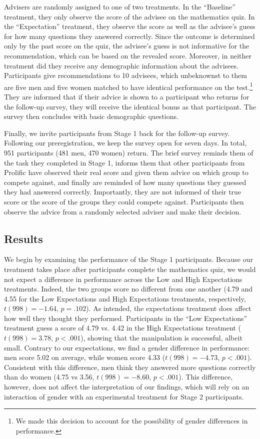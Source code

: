 \documentclass[
  man,
  floatsintext,
  longtable,
  nolmodern,
  notxfonts,
  notimes,
  colorlinks=true,linkcolor=blue,citecolor=blue,urlcolor=blue]{apa7}
\begin{document}
Advisers are randomly assigned to one of two treatments. In the
``Baseline'' treatment, they only observe the score of the advisee on
the mathematics quiz. In the ``Expectation'' treatment, they observe the
score as well as the advisee's guess for how many questions they
answered correctly. Since the outcome is determined only by the past
score on the quiz, the advisee's guess is not informative for the
recommendation, which can be based on the revealed score. Moreover, in
neither treatment did they receive any demographic information about the
advisees. Participants give recommendations to 10 advisees, which
unbeknownst to them are five men and five women matched to have
identical performance on the test.\footnote{We made this decision to
  account for the possibility of gender differences in performance.}
They are informed that if their advice is shown to a participant who
returns for the follow-up survey, they will receive the identical bonus
as that participant. The survey then concludes with basic demographic
questions.

Finally, we invite participants from Stage 1 back for the follow-up
survey. Following our preregistration, we keep the survey open for seven
days. In total, 951 participants (481 men, 470 women) return. The brief
survey reminds them of the task they completed in Stage 1, informs them
that other participants from Prolific have observed their real score and
given them advice on which group to compete against, and finally are
reminded of how many questions they guessed they had answered correctly.
Importantly, they are not informed of their true score or the score of
the groups they could compete against. Participants then observe the
advice from a randomly selected adviser and make their decision.

\subsection{Results}\label{results-2}

We begin by examining the performance of the Stage 1 participants.
Because our treatment takes place after participants complete the
mathematics quiz, we would not expect a difference in performance across
the Low and High Expectations treatments. Indeed, the two groups score
no different from one another (4.79 and 4.55 for the Low Expectations
and High Expectations treatments, respectively, \(t(998) = -1.64\),
\(p = .102\)). As intended, the expectations treatment does affect how
well they thought they performed. Participants in the ``Low
Expectations'' treatment guess a score of 4.79 vs. 4.42 in the High
Expectations treatment (\(t(998) = 3.78\), \(p < .001\)), showing that
the manipulation is successful, albeit small. Contrary to our
expectations, we find a gender difference in performance: men score 5.02
on average, while women score 4.33 (\(t(998) = -4.73\), \(p < .001\)).
Consistent with this difference, men think they answered more questions
correctly than do women (4.75 vs 3.56, \(t(998) = -8.60\),
\(p < .001\)). This difference, however, does not affect the
interpretation of our findings, which will rely on an interaction of
gender with an experimental treatment for Stage 2 participants.
\end{document}
